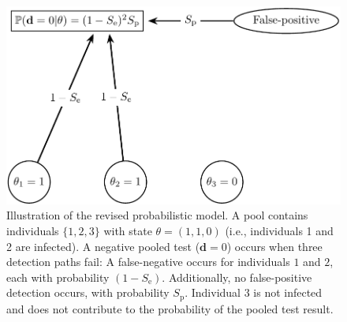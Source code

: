 \documentclass{article}
\renewcommand{\Pr}{\mathbb{P}}
\newcommand{\data}{\mathbf{d}}
\newcommand{\sens}{S_{\text{e}}}
\newcommand{\spec}{S_{\text{p}}}
\begin{document}
\begin{figure}[H]
  \centering
  \includegraphics[width=\textwidth]{model_pic.jpg}

      

  \caption{Illustration of the revised probabilistic model. A pool
    contains individuals $\{1,2,3\}$ with state $\theta=(1,1,0)$
    (i.e., individuals 1 and 2 are infected). A negative pooled test
    ($\data=0$) occurs when three detection paths fail: A
    false-negative occurs for individuals $1$ and $2$, each with
    probability $(1-\sens)$.  Additionally, no false-positive
    detection occurs, with probability $\spec$. Individual $3$ is not
    infected and does not contribute to the probability of the pooled
    test result.}\label{fig:likelihood}
\end{figure}
\end{document}
